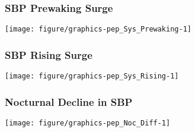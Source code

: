 \documentclass[10pt]{article}\usepackage[]{graphicx}\usepackage[]{color}
\makeatletter
\def\maxwidth{ %
  \ifdim\Gin@nat@width>\linewidth
    \linewidth
  \else
    \Gin@nat@width
  \fi
}
\newenvironment{knitrout}{}{} %
\makeatother
\begin{document}
\begin{landscape}
\subsubsection{SBP Prewaking Surge}
\begin{knitrout}
\color{fgcolor}

{\centering \texttt{[image: figure/graphics-pep\_Sys\_Prewaking-1]} 

}



\end{knitrout}
\end{landscape}
\begin{landscape}
\subsubsection{SBP Rising Surge}
\begin{knitrout}
\color{fgcolor}

{\centering \texttt{[image: figure/graphics-pep\_Sys\_Rising-1]} 

}



\end{knitrout}
\end{landscape}
\begin{landscape}
\subsubsection{Nocturnal Decline in SBP}
\begin{knitrout}
\color{fgcolor}

{\centering \texttt{[image: figure/graphics-pep\_Noc\_Diff-1]} 

}



\end{knitrout}
\end{landscape}
\end{document}
